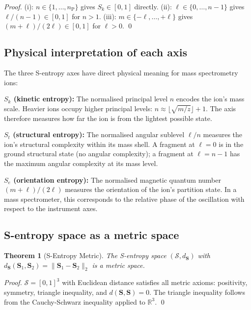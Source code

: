 \documentclass[twocolumn,10pt,a4paper]{article}
\theoremstyle{thmstyle}
\newtheorem{theorem}{Theorem}[section]
\theoremstyle{definition}
\theoremstyle{remark}
\newcommand{\R}{\mathbb{R}}
\newcommand{\Sv}{\mathbf{S}}
\newcommand{\Sk}{S_{k}}
\newcommand{\St}{S_{t}}
\newcommand{\Se}{S_{e}}
\newcommand{\calS}{\mathcal{S}}
\newcommand{\nP}{n_{\mathrm{P}}}
\begin{document}
\begin{proof}
(i): $n \in \{1,\ldots,\nP\}$ gives $\Sk \in [0,1]$ directly.
(ii): $\ell \in \{0,\ldots,n-1\}$ gives $\ell/(n-1) \in [0,1]$ for $n>1$.
(iii): $m \in \{-\ell,\ldots,+\ell\}$ gives $(m+\ell)/(2\ell) \in [0,1]$
for $\ell>0$. \qed
\end{proof}

\subsection{Physical interpretation of each axis}

The three S-entropy axes have direct physical meaning for mass spectrometry
ions:

\textbf{$\Sk$ (kinetic entropy):} The normalised principal level $n$
encodes the ion's mass scale. Heavier ions occupy higher principal levels:
$n \approx \lfloor\sqrt{m/z}\rfloor + 1$. The axis therefore measures
how far the ion is from the lightest possible state.

\textbf{$\St$ (structural entropy):} The normalised angular sublevel
$\ell/n$ measures the ion's structural complexity within its mass shell.
A fragment at $\ell = 0$ is in the ground structural state (no angular
complexity); a fragment at $\ell = n-1$ has the maximum angular
complexity at its mass level.

\textbf{$\Se$ (orientation entropy):} The normalised magnetic quantum
number $(m+\ell)/(2\ell)$ measures the orientation of the ion's partition
state. In a mass spectrometer, this corresponds to the relative phase of
the oscillation with respect to the instrument axes.

\subsection{S-entropy space as a metric space}

\begin{theorem}[S-Entropy Metric]
\label{thm:metric}
The S-entropy space $(\calS, d_{\Sv})$ with
$d_{\Sv}(\Sv_1, \Sv_2) = \|\Sv_1 - \Sv_2\|_2$
is a metric space.
\end{theorem}

\begin{proof}
$\calS = [0,1]^3$ with Euclidean distance satisfies all metric axioms:
positivity, symmetry, triangle inequality, and $d(\Sv,\Sv) = 0$. The
triangle inequality follows from the Cauchy-Schwarz inequality applied
to $\R^3$. \qed
\end{proof}
\end{document}
